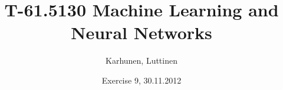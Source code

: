 
\title{T-61.5130 Machine Learning and Neural Networks}
\author{Karhunen, Luttinen}
\date{Exercise 9, 30.11.2012}

\usepackage{pdfpages}


\newcommand{\vect}[1]{{\bf{#1}}}
\newcommand{\svect}[1]{\boldsymbol{#1}}
\newcommand{\matr}[1]{\boldsymbol{#1}}

\renewcommand{\vec}[1]{\mathbf{#1}}
\newcommand{\set}[1]{\mathcal{#1}}
\newcommand{\C}{\set{C}}
\newcommand{\E}{\mathcal{E}}
\newcommand{\I}{\vec{I}}
\renewcommand{\L}{\mathcal{L}}
\newcommand{\N}{\mathrm{I \negmedspace N}}
\newcommand{\R}{\mathrm{I \negmedspace R}}
\newcommand{\V}{\set{V}}
\newcommand{\W}{\vec{W}}
\newcommand{\X}{\set{X}}
\newcommand{\e}{\vec{e}}
\newcommand{\h}{\vec{h}}
\newcommand{\m}{\vec{m}}
\newcommand{\mub}{\boldsymbol{\mu}}
\newcommand{\n}{\vec{n}}
\renewcommand{\t}{\vec{t}}
\renewcommand{\u}{\vec{u}}
\renewcommand{\v}{\vec{v}}
\newcommand{\w}{\vec{w}}
\newcommand{\x}{\vec{x}}
\newcommand{\y}{\vec{y}}
\newcommand{\Y}{\vec{Y}}
\newcommand{\z}{\vec{z}}
\newcommand{\argmin}{\operatornamewithlimits{argmin}}
\newcommand{\argmax}{\operatornamewithlimits{argmax}}
\newcommand{\bSigma}{\boldsymbol{\Sigma}}





\maketitle

